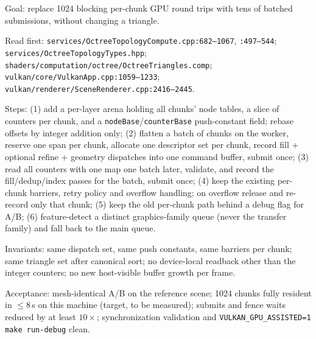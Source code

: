 \documentclass[11pt,a4paper]{article}
\begin{document}
\begin{tcolorbox}[promptbox={Prompt 3 --- Batched, non-blocking chunk topology}]
Goal: replace 1024 blocking per-chunk GPU round trips with tens of batched
submissions, without changing a triangle.

Read first: \texttt{services/\allowbreak OctreeTopologyCompute.cpp:682--1067},
\texttt{:497--544}; \texttt{services/\allowbreak OctreeTopologyTypes.hpp};
\texttt{shaders/\allowbreak computation/\allowbreak octree/\allowbreak OctreeTriangles.comp};
\texttt{vulkan/\allowbreak core/\allowbreak VulkanApp.cpp:1059--1233};
\texttt{vulkan/\allowbreak renderer/\allowbreak SceneRenderer.cpp:2416--2445}.

Steps: (1) add a per-layer arena holding all chunks' node tables, a slice of
counters per chunk, and a \texttt{nodeBase}/\texttt{counterBase} push-constant
field; rebase offsets by integer addition only; (2) flatten a batch of
chunks on the worker, reserve one span per chunk, allocate one descriptor set
per chunk, record fill + optional refine + geometry dispatches into one
command buffer, submit once; (3) read all counters with one map one batch
later, validate, and record the fill/dedup/index passes for the batch, submit
once; (4) keep the existing per-chunk barriers, retry policy and overflow
handling; on overflow release and re-record only that chunk; (5) keep the
old per-chunk path behind a debug flag for A/B; (6) feature-detect a distinct
graphics-family queue (never the transfer family) and fall back to the main
queue.

Invariants: same dispatch set, same push constants, same barriers per chunk;
same triangle set after canonical sort; no device-local readback other than
the integer counters; no new host-visible buffer growth per frame.

Acceptance: mesh-identical A/B on the reference scene; 1024 chunks fully
resident in $\le 8$\,s on this machine (target, to be measured); submits and
fence waits reduced by at least $10\times$; synchronization validation and
\texttt{VULKAN\_GPU\_ASSISTED=1 make run-debug} clean.
\end{tcolorbox}
\end{document}
